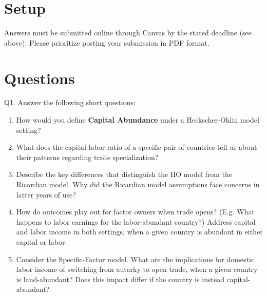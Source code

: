 \documentclass[12pt]{article}
\begin{document}
\singlespacing


\bigskip

\doublespacing



\section*{Setup}

\noindent 
Answers must be submitted online through Canvas by the stated deadline (see above).
Please prioritize posting your submission in PDF format.

\section*{Questions}

\noindent Q1. Answer the following short questions:

\begin{enumerate}[1)]
	
	\item How would you define {\bf Capital Abundance} under a Heckscher-Ohlin model setting?
	
	\vspace{1in}
	
	\item What does the capital-labor ratio of a specific pair of countries tell us about their patterns regarding trade specialization?
	
	\vspace{1in}
	
	\newpage
	
	\item Describe the key differences that distinguish the HO model from the Ricardian model. Why did the Ricardian model assumptions face concerns in latter years of use?
	
	\vspace{1.5in}
	
	\item How do outcomes play out for factor owners when trade opens? (E.g. What happens to labor earnings for the labor-abundant country?) Address capital and labor income in both settings, when a given country is abundant in either capital or labor. 
	
	\vspace{2in}
	
	\item Consider the Specific-Factor model. What are the implications for domestic labor income of switching from autarky to open trade, when a given country is land-abundant? Does this impact differ if the country is instead capital-abundant? 
	
	\vspace{1in}
	
\end{enumerate}
\end{document}
